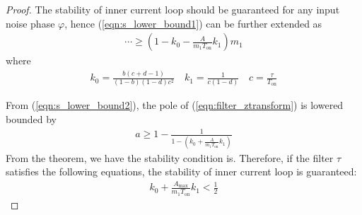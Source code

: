 \begin{proof}
The stability of inner current loop should be guaranteed for any input noise phase $\varphi$, hence (\ref{eqn:s_lower_bound1}) can be further extended as
\begin{align}  \label{eqn:s_lower_bound2}
    \cdots \ge (1- k_0 - \frac{A}{m_1 T_{\text{on}}} k_1)m_1   
\end{align}
where
\begin{align}
    k_0 = \frac{b(c+d-1)}{(1-b)(1-d)c^2} \quad k_1 = \frac{1}{c(1-d)} \quad c = \frac{\tau}{T_{\text{on}}}
\end{align}



From (\ref{eqn:s_lower_bound2}), the pole of (\ref{eqn:filter_ztransform}) is lowered bounded by
\begin{align}
    a \ge  1 - \frac{1}{1 - (k_0 + \frac{A}{m_1 T_{\text{on}}} k_1 )}
\end{align}
From the theorem, we have the stability condition is. Therefore, if the filter $\tau$ satisfies the following equations, the stability of inner current loop is guaranteed: 
\begin{align}
    k_0 + \frac{A_{\text{max}}}{m_1 T_{\text{on}}} k_1 < \frac{1}{2}
\end{align}

\end{proof}
